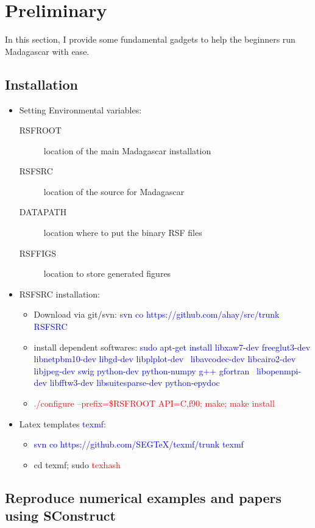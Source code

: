 \section{Preliminary}

In this section, I provide some fundamental gadgets to help the beginners run Madagascar with ease.

\subsection{Installation}

\begin{itemize}
 \item Setting Environmental variables:
 \begin{description}
  \item[RSFROOT] location of the main Madagascar installation
  \item[RSFSRC] location of the source for Madagascar
  \item[DATAPATH] location where to put the binary RSF files 
  \item[RSFFIGS]location to store generated figures
 \end{description}
 \item RSFSRC installation: 
 \begin{itemize}
  \item Download via git/svn:  \textcolor{blue}{svn co https://github.com/ahay/src/trunk RSFSRC}
  \item install dependent softwares: \textcolor{blue}{sudo apt-get install libxaw7-dev freeglut3-dev libnetpbm10-dev libgd-dev libplplot-dev \
  libavcodec-dev libcairo2-dev libjpeg-dev swig python-dev python-numpy g++ gfortran \
  libopenmpi-dev libfftw3-dev libsuitesparse-dev python-epydoc}
  \item \textcolor{red}{./configure --prefix=\$RSFROOT API=C,f90; make; make install}
 \end{itemize}
 \item Latex templates \textcolor{blue}{texmf}:
 \begin{itemize}
  \item \textcolor{blue}{svn co https://github.com/SEGTeX/texmf/trunk texmf}
  \item cd texmf; sudo \textcolor{red}{texhash}
  \end{itemize}
\end{itemize}


\subsection{Reproduce numerical examples and papers using SConstruct}

